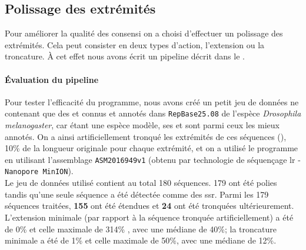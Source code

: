 \documentclass[10pt]{article}
\begin{document}
\bigskip

\subsection{Polissage des extrémités} Pour améliorer la qualité des consensi on a choisi d'effectuer un polissage des extrémités. Cela peut consister en deux types d'action, l'extension ou la troncature. \`A cet effet nous avons écrit un pipeline décrit dans le \paragraphautorefname{ \ref{sec:polish}}. \\


\paragraph{\'Evaluation du pipeline} Pour tester l'efficacité du programme, nous avons créé un petit jeu de données ne contenant que des \acrlong{et} connus et annotés dans \texttt{RepBase25.08} de l'espèce \textit{Drosophila melanogaster}, car étant une espèce modèle, ses \acrlong{et} sont parmi ceux les mieux annotés. On a ainsi artificiellement tronqué les extrémités de ces séquences (\linkautorefname{\ref{link11}}), 10\% de la longueur originale pour chaque extrémité, et on a utilisé le programme en utilisant l'assemblage \texttt{ASM2016949v1} (obtenu par technologie de séquençage \acrlong{lr} - \texttt{Nanopore MinION}). \\
Le jeu de données utilisé contient au total 180 séquences. 179 ont été polies tandis qu'une seule séquence a été détectée comme des \acrshort{ssr}. Parmi les 179 séquences traitées, \textbf{155} ont été étendues et \textbf{24} ont été tronquées ultérieurement. L'extension minimale (par rapport à la séquence tronquée artificiellement) a été de 0\% et celle maximale de 314\% , avec une médiane de 40\%; la troncature minimale a été de 1\% et celle maximale de 50\%, avec une médiane de 12\%. \\

\bigskip
\end{document}

